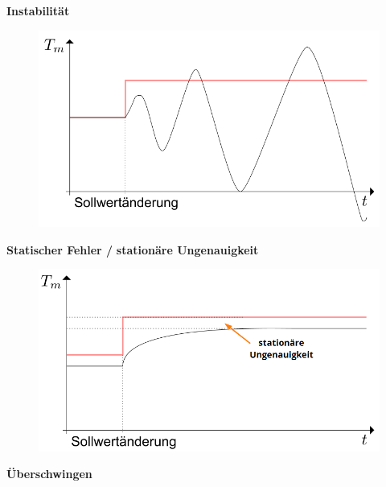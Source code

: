 \documentclass[
  10pt,
  a4paper,
]{article}
\numberwithin{equation}{section}
\begin{document}
\begin{multicols}{2}
\begin{figure}[H]
{}

\end{figure}

\textbf{Instabilität}

\begin{figure}[H]

{\centering \includegraphics{images/fuhrungsverhalten/instabil.png}

}

\end{figure}

\textbf{Statischer Fehler /} \textbf{stationäre Ungenauigkeit}

\begin{figure}[H]

{\centering \includegraphics{images/fuhrungsverhalten/stationary.png}

}

\end{figure}

\textbf{Überschwingen}

\begin{figure}[H]


\end{figure}
\end{multicols}
\end{document}
